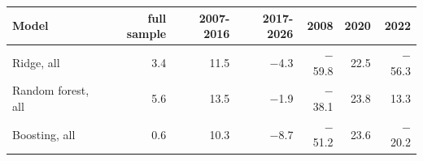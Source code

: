 \begin{tabular}{lrrrrrr}
\toprule
Model & full sample & 2007-2016 & 2017-2026 & 2008 & 2020 & 2022 \\
\midrule
Ridge, all & 3.4 & 11.5 & $-$4.3 & $-$59.8 & 22.5 & $-$56.3 \\
Random forest, all & 5.6 & 13.5 & $-$1.9 & $-$38.1 & 23.8 & 13.3 \\
Boosting, all & 0.6 & 10.3 & $-$8.7 & $-$51.2 & 23.6 & $-$20.2 \\
\bottomrule
\end{tabular}
